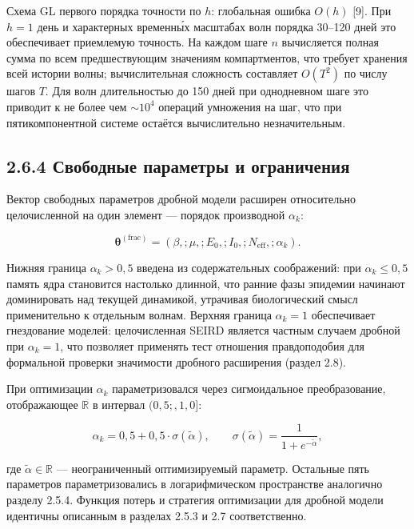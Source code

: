 \documentclass[12pt]{article}
\begin{document}
Схема GL первого порядка точности по \(h\): глобальная ошибка \(O(h)\)
{[}9{]}. При \(h = 1\) день и характерных временны́х масштабах волн
порядка 30--120 дней это обеспечивает приемлемую точность. На каждом
шаге \(n\) вычисляется полная сумма по всем предшествующим значениям
компартментов, что требует хранения всей истории волны; вычислительная
сложность составляет \(O(T^2)\) по числу шагов \(T\). Для волн
длительностью до 150 дней при однодневном шаге это приводит к не более
чем \(\sim 10^4\) операций умножения на шаг, что при пятикомпонентной
системе остаётся вычислительно незначительным.

\subsection{2.6.4 Свободные параметры и
ограничения}\label{ux441ux432ux43eux431ux43eux434ux43dux44bux435-ux43fux430ux440ux430ux43cux435ux442ux440ux44b-ux438-ux43eux433ux440ux430ux43dux438ux447ux435ux43dux438ux44f}

Вектор свободных параметров дробной модели расширен относительно
целочисленной на один элемент --- порядок производной \(\alpha_k\):

\[\boldsymbol{\theta}^{(\text{frac})} = (\beta,; \mu,; E_0,; I_0,; N_{\text{eff}},; \alpha_k).\]

Нижняя граница \(\alpha_k > 0{,}5\) введена из содержательных
соображений: при \(\alpha_k \leq 0{,}5\) память ядра становится
настолько длинной, что ранние фазы эпидемии начинают доминировать над
текущей динамикой, утрачивая биологический смысл применительно к
отдельным волнам. Верхняя граница \(\alpha_k = 1\) обеспечивает
гнездование моделей: целочисленная SEIRD является частным случаем
дробной при \(\alpha_k = 1\), что позволяет применять тест отношения
правдоподобия для формальной проверки значимости дробного расширения
(раздел 2.8).

При оптимизации \(\alpha_k\) параметризовался через сигмоидальное
преобразование, отображающее \(\mathbb{R}\) в интервал
\((0{,}5;, 1{,}0]\):

\[\alpha_k = 0{,}5 + 0{,}5 \cdot \sigma(\tilde{\alpha}), \qquad \sigma(\tilde{\alpha}) = \frac{1}{1 + e^{-\tilde{\alpha}}},\]

где \(\tilde{\alpha} \in \mathbb{R}\) --- неограниченный оптимизируемый
параметр. Остальные пять параметров параметризовались в логарифмическом
пространстве аналогично разделу 2.5.4. Функция потерь и стратегия
оптимизации для дробной модели идентичны описанным в разделах 2.5.3 и
2.7 соответственно.
\end{document}
